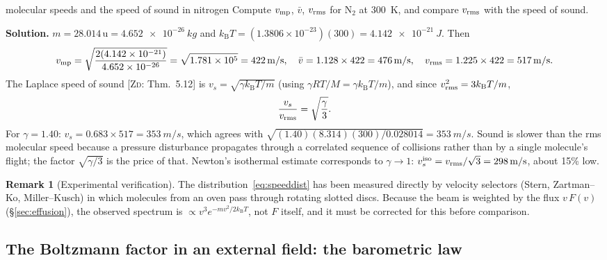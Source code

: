 \documentclass[11pt,a4paper]{report}
\theoremstyle{definition}
\newtheorem{remark}[definition]{Remark}
\theoremstyle{plain}
\newcommand{\ZD}[1]{[\textsc{Zd}: #1]}   %
\newcommand{\kB}{k_{\mathrm{B}}}
\newcommand{\vbar}{\bar{v}}
\begin{document}
\begin{workedex}{molecular speeds and the speed of sound in nitrogen}
Compute $v_{\rm mp}$, $\vbar$, $v_{\rm rms}$ for N$_2$ at \SI{300}{K}, and compare $v_{\rm rms}$ with the speed of sound.

\medskip\noindent\textbf{Solution.} $m=28.014\,\mathrm{u}=\SI{4.652e-26}{kg}$ and $\kB T=(1.3806\times10^{-23})(300)=\SI{4.142e-21}{J}$. Then
\[
v_{\rm mp}=\sqrt{\frac{2(4.142\times10^{-21})}{4.652\times10^{-26}}}=\sqrt{1.781\times10^5}=\SI{422}{m/s},\quad
\vbar=1.128\times422=\SI{476}{m/s},\quad
v_{\rm rms}=1.225\times422=\SI{517}{m/s}.
\]
The Laplace speed of sound \ZD{Thm.~5.12} is $v_s=\sqrt{\gamma\kB T/m}$ (using $\gamma RT/M=\gamma\kB T/m$), and since $v_{\rm rms}^2=3\kB T/m$,
\begin{equation}
\frac{v_s}{v_{\rm rms}}=\sqrt{\frac\gamma3}.
\label{eq:vsvrms}
\end{equation}
For $\gamma=1.40$: $v_s=0.683\times517=\SI{353}{m/s}$, which agrees with $\sqrt{(1.40)(8.314)(300)/0.028014}=\SI{353}{m/s}$. Sound is slower than the rms molecular speed because a pressure disturbance propagates through a correlated sequence of collisions rather than by a single molecule's flight; the factor $\sqrt{\gamma/3}$ is the price of that. Newton's isothermal estimate corresponds to $\gamma\to1$: $v_s^{\rm iso}=v_{\rm rms}/\sqrt3=\SI{298}{m/s}$, about 15\% low.
\end{workedex}

\begin{remark}[Experimental verification]
The distribution~\eqref{eq:speeddist} has been measured directly by velocity selectors (Stern, Zartman--Ko, Miller--Kusch) in which molecules from an oven pass through rotating slotted discs. Because the beam is weighted by the flux $v\,F(v)$ (\S\ref{sec:effusion}), the observed spectrum is $\propto v^3e^{-mv^2/2\kB T}$, not $F$ itself, and it must be corrected for this before comparison.
\end{remark}

\subsection{The Boltzmann factor in an external field: the barometric law}
\label{sec:boltzfactor}
\end{document}
